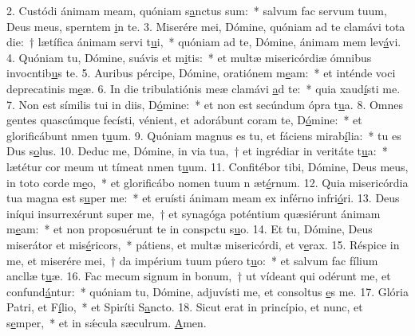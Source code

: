 2. Custódi ánimam meam, quóniam s\uline{a}nctus sum:~* salvum fac servum tuum, Deus meus, sperntem \uline{i}n te.
3. Miserére mei, Dómine, quóniam ad te clamávi tota die:~† lætífica ánimam servi t\uline{u}i,~* quóniam ad te, Dómine, ánimam mem lev\uline{á}vi.
4. Quóniam tu, Dómine, suávis et m\uline{i}tis:~* et multæ misericórdiæ ómnibus invocntib\uline{u}s te.
5. Auribus pércipe, Dómine, oratiónem m\uline{e}am:~* et inténde voci deprecatinis m\uline{e}æ.
6. In die tribulatiónis meæ clamávi \uline{a}d te:~* quia xaud\uline{í}sti me.
7. Non est símilis tui in diis, D\uline{ó}mine:~* et non est secúndum ópra t\uline{u}a.
8. Omnes gentes quascúmque fecísti, vénient, et adorábunt coram te, D\uline{ó}mine:~* et glorificábunt nmen t\uline{u}um.
9. Quóniam magnus es tu, et fáciens mirab\uline{í}lia:~* tu es Dus s\uline{o}lus.
10. Deduc me, Dómine, in via tua,~† et ingrédiar in veritáte t\uline{u}a:~* lætétur cor meum ut tímeat nmen t\uline{u}um.
11. Confitébor tibi, Dómine, Deus meus, in toto corde m\uline{e}o,~* et glorificábo nomen tuum n æt\uline{é}rnum.
12. Quia misericórdia tua magna est s\uline{u}per me:~* et eruísti ánimam meam ex inférno infri\uline{ó}ri.
13. Deus iníqui insurrexérunt super me,~† et synagóga poténtium quæsiérunt ánimam m\uline{e}am:~* et non proposuérunt te in conspctu s\uline{u}o.
14. Et tu, Dómine, Deus miserátor et mis\uline{é}ricors,~* pátiens, et multæ misericórdi, et v\uline{e}rax.
15. Réspice in me, et miserére mei,~† da impérium tuum púero t\uline{u}o:~* et salvum fac fílium ancllæ t\uline{u}æ.
16. Fac mecum signum in bonum,~† ut vídeant qui odérunt me, et confund\uline{á}ntur:~* quóniam tu, Dómine, adjuvísti me, et consoltus \uline{e}s me.
17. Glória Patri, et F\uline{í}lio,~* et Spiríti S\uline{a}ncto.
18. Sicut erat in princípio, et nunc, et s\uline{e}mper,~* et in sǽcula sæculrum. \uline{A}men.
